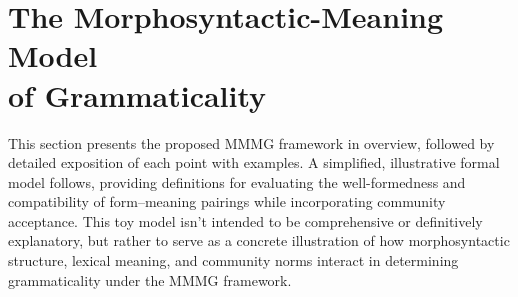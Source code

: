 \section{The Morphosyntactic-Meaning Model \\of Grammaticality}\label{sec:framework}

This section presents the proposed MMMG framework in overview, followed by detailed exposition of each point with examples. A simplified, illustrative formal model follows, providing definitions for evaluating the well-formedness and compatibility of form--meaning pairings while incorporating community acceptance. This toy model isn't intended to be comprehensive or definitively explanatory, but rather to serve as a concrete illustration of how morphosyntactic structure, lexical meaning, and community norms interact in determining grammaticality under the MMMG framework.


